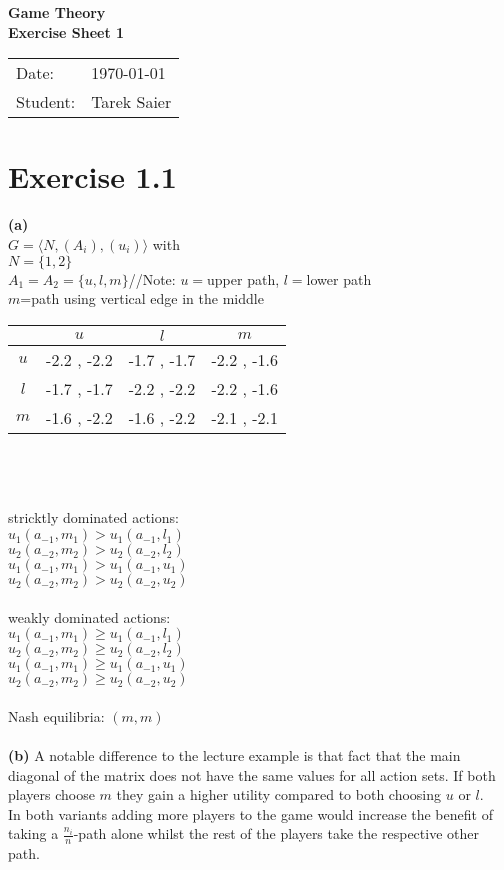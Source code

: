 \documentclass[11pt,a4paper]{article}
\newcommand{\sheetNr}{1}
\begin{document}
\begin{center}
\Huge{\textbf{Game Theory}}\\
\LARGE{\textbf{Exercise Sheet \sheetNr}}
\end{center}
\vspace{2cm}
\begin{tabular}{ll}
Date: & \today\\
Student: & Tarek Saier
\end{tabular}

\section*{Exercise 1.1}
\textbf{(a)}\\
$G=\langle N, (A_i), (u_i)\rangle$ with\\
$N=\{1,2\}$\\
$A_1=A_2=\{u,l,m\}$\hphantom{tabtab}//Note: $u=$upper path, $l=$lower path\\
\hphantom{tabtabtabtabtabtabtabtabtabtabta}$m$=path using vertical edge in the middle\\

\begin{tabular}{c|c|c|c|}
  & $u$ & $l$ & $m$\\
\hline
$u$ & -2.2 , -2.2 & -1.7 , -1.7 & -2.2 , -1.6\\
\hline
$l$ & -1.7 , -1.7 & -2.2 , -2.2 & -2.2 , -1.6\\
\hline
$m$ & -1.6 , -2.2 & -1.6 , -2.2 & -2.1 , -2.1\\
\hline
\end{tabular}\\
\\
\\
stricktly dominated actions:\\
$u_1(a_{-1},m_1)>u_1(a_{-1},l_1)$\\
$u_2(a_{-2},m_2)>u_2(a_{-2},l_2)$\\
$u_1(a_{-1},m_1)>u_1(a_{-1},u_1)$\\
$u_2(a_{-2},m_2)>u_2(a_{-2},u_2)$\\
\\
weakly dominated actions:\\
$u_1(a_{-1},m_1)\ge u_1(a_{-1},l_1)$\\
$u_2(a_{-2},m_2)\ge u_2(a_{-2},l_2)$\\
$u_1(a_{-1},m_1)\ge u_1(a_{-1},u_1)$\\
$u_2(a_{-2},m_2)\ge u_2(a_{-2},u_2)$\\
\\
Nash equilibria: $(m,m)$\\
\\
\textbf{(b)} A notable difference to the lecture example is that fact that the main diagonal of the matrix does not have the same values for all action sets. If both players choose $m$ they gain a higher utility compared to both choosing $u$ or $l$.\\
In both variants adding more players to the game would increase the benefit of taking a $\frac{n_i}{n}$-path alone whilst the rest of the players take the respective other path.
\newpage
\end{document}

